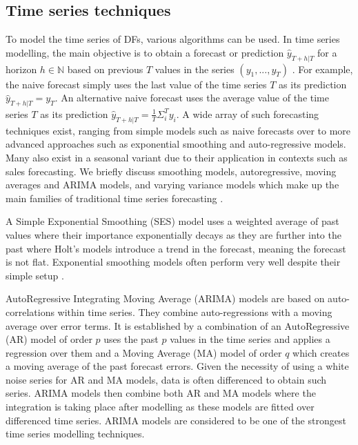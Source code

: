 \subsection{Time series techniques}\label{sec:3b:timeseries}

To model the time series of DFs, various algorithms can be used.
In time series modelling, the main objective is to obtain a forecast or prediction $\hat{y}_{T+h|T}$ for a horizon $h\in \mathbb{N}$ based on previous $T$ values in the series $(y_1,...,y_T)$ \cite{hyndman2018forecasting}.
For example, the naive forecast simply uses the last value of the time series $T$ as its prediction $\hat{y}_{T+h|T}=y_T$.
An alternative naive forecast uses the average value of the time series $T$ as its prediction $\hat{y}_{T+h|T}=\frac{1}{T}\Sigma_i^{T} y_i$.
A wide array of such forecasting techniques exist, ranging from simple models such as naive forecasts over to more advanced approaches such as exponential smoothing and auto-regressive models.
Many also exist in a seasonal variant due to their application in contexts such as sales forecasting.
We briefly discuss smoothing models, autoregressive, moving averages and ARIMA models, and varying variance models which make up the main families of traditional time series forecasting \cite{hyndman2018forecasting}.

A Simple Exponential Smoothing (SES) model uses a weighted average of past values where their importance exponentially decays as they are further into the past where Holt's models introduce a trend in the forecast, meaning the forecast is not flat.
Exponential smoothing models often perform very well despite their simple setup \cite{makridakis2018statistical}.

AutoRegressive Integrating Moving Average (ARIMA) models are based on auto-correlations within time series. 
They combine auto-regressions with a moving average over error terms.
It is established by a combination of an AutoRegressive (AR) model of order $p$ uses the past $p$ values in the time series and applies a regression over them and a Moving Average (MA) model of order $q$ which creates a moving average of the past forecast errors.
Given the necessity of using a white noise series for AR and MA models, data is often differenced to obtain such series.
ARIMA models then combine both AR and MA models where the integration is taking place after modelling as these models are fitted over differenced time series.
ARIMA models are considered to be one of the strongest time series modelling techniques.

